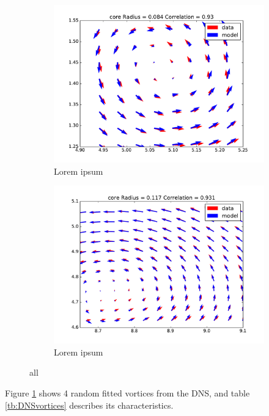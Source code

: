 \documentclass[12pt, a4paper, openany]{memoir}
\begin{document}
\begin{figure}[h!]
	\begin{subfigure}[b]{0.4\textwidth}
		\centering
		\includegraphics[width=\textwidth]{figure/dns_fit3.pdf}
		\caption{Lorem ipsum}
	\end{subfigure}
	\begin{subfigure}[b]{0.4\textwidth}
		\centering
		\includegraphics[width=\textwidth]{figure/dns_fit6.pdf}
		\caption{Lorem ipsum}
	\end{subfigure}
	\caption{all}
	\label{fig:vorticesDNS}
\end{figure}

Figure \ref{fig:vorticesDNS} shows 4 random fitted vortices from the DNS, and table \ref{tb:DNSvortices} describes its characteristics.
\end{document}
